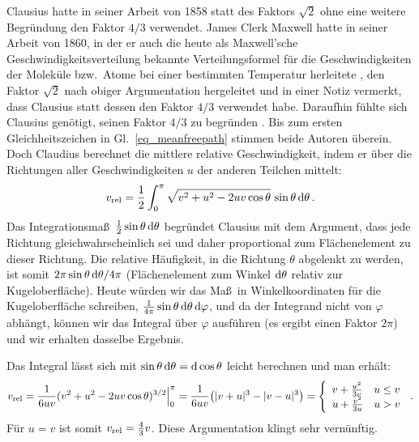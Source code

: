 Clausius hatte in seiner Arbeit von 1858 \cite{Clausius58} statt des Faktors $\sqrt{2}$ ohne eine weitere Begr\"undung
den Faktor $4/3$ verwendet. 
James Clerk Maxwell hatte in seiner Arbeit von 1860, in der er auch die heute als
Maxwell'sche Geschwindigkeitsverteilung bekannte Verteilungsformel f\"ur die Geschwindigkeiten der
Molek\"ule bzw.\ Atome bei einer bestimmten Temperatur herleitete \cite{Maxwell60}, den Faktor $\sqrt{2}$
nach obiger Argumentation hergeleitet und in einer Notiz vermerkt, dass Clausius statt dessen den Faktor 
$4/3$ verwendet habe. Daraufhin f\"uhlte sich Clausius gen\"otigt, seinen Faktor $4/3$ zu begr\"unden \cite{Clausius60}. 
Bis zum ersten Gleichheitszeichen in
Gl.\ \ref{eq_meanfreepath} stimmen beide Autoren \"uberein. Doch Claudius berechnet die mittlere
relative Geschwindigkeit, indem er \"uber die Richtungen aller Geschwindigkeiten $u$ der anderen Teilchen
mittelt:
\begin{equation}
    v_{\rm rel} = \frac{1}{2} \int_0^\pi \sqrt{ v^2 + u^2 - 2uv \cos \theta} \, \sin \theta \, {\rm d} \theta \, .  
\end{equation}
Das Integrationsma\ss\ $\frac{1}{2} \sin \theta \, {\rm d}\theta$ begr\"undet Clausius mit dem Argument,
dass jede Richtung gleichwahrscheinlich sei und daher proportional zum Fl\"achenelement zu dieser Richtung.
Die relative H\"aufigkeit, in die Richtung $\theta$ abgelenkt zu werden, ist somit $2 \pi \sin \theta \, {\rm d}\theta/4\pi$
(Fl\"achenelement zum Winkel ${\rm d}\theta$ relativ zur Kugeloberfl\"ache). Heute w\"urden wir das Ma\ss\ 
in Winkelkoordinaten f\"ur die Kugeloberfl\"ache schreiben, $\frac{1}{4\pi} \sin \theta \, {\rm d} \theta\, {\rm d}\varphi$, 
und da der Integrand nicht von $\varphi$ abh\"angt, k\"onnen wir das Integral \"uber $\varphi$
ausf\"uhren (es ergibt einen Faktor $2\pi$) und wir erhalten 
dasselbe Ergebnis.

Das Integral l\"asst sich mit $\sin\theta \, {\rm d}\theta = {\rm d}\cos \theta$ leicht berechnen und man
erh\"alt:
\begin{equation}
    v_{\rm rel} = \frac{1}{6uv}  (v^2 + u^2 - 2uv \cos \theta )^{3/2} \Big|_0^\pi  
     =  \frac{1}{6 uv} \big( |v+u|^3 - |v-u|^3 \big)  
     =  \left\{ \begin{array}{ll}  v + \frac{u^2}{3v} &  u\leq v \\  u + \frac{v^2}{3u} & u>v \end{array} \right. \, .
\end{equation}
F\"ur $u=v$ ist somit $v_{\rm rel}= \frac{4}{3}v$. Diese Argumentation klingt sehr vern\"unftig. 


